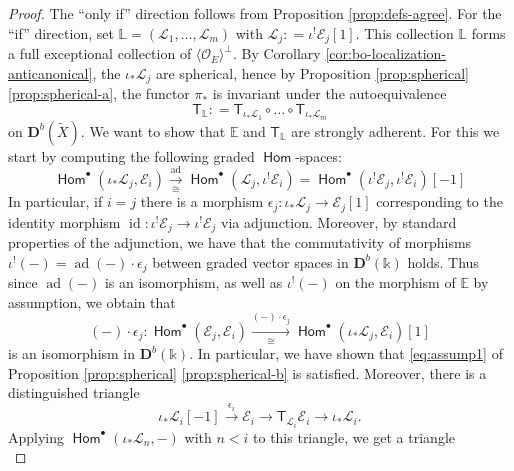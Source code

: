\documentclass[a4paper,11pt, reqno]{amsart}
\def\E{\mathbb E}
\def\L{\mathbb L}
\def\DD{\mathbf D}
\def\OO{\mathcal O}
\def\sE{\mathscr{E}}
\def\sL{\mathscr{L}}
\def\id{{\operatorname{id}}}
\def\ad{{\operatorname{ad}}}
\newcommand{\opname}[1]{\operatorname{\mathsf{#1}}}
\newcommand{\Hom}{\opname{Hom}}
\def\Db{\DD^b}
\newcommand{\bT}{\mathsf{T}}
\theoremstyle{plain}
\theoremstyle{definition}
\numberwithin{equation}{section}
\newlength{\arrow}
\begin{document}
\begin{proof}
    The ``only if'' direction follows from Proposition \ref{prop:defs-agree}.
    For the ``if'' direction,
    set $\L = ( \sL_1 , \ldots , \sL_{m} )$ with $\sL_j : = \iota^!  \sE_j  [1]$. 
    This collection $\L$ forms a full exceptional collection of $\langle \OO_E \rangle^\perp$. 
    By Corollary \ref{cor:bo-localization-anticanonical}, the $\iota_\ast\sL_j$ are spherical, hence
    by Proposition \ref{prop:spherical} \ref{prop:spherical-a}, the functor $\pi_\ast $ is invariant under the autoequivalence
    \[\bT_\L : = \bT_{\iota_\ast\sL_1} \circ \ldots \circ \bT_{\iota_\ast\sL_m}\] 
    on $\Db( \tilde{X}).$
    We want to show that $\E$ and $\bT_{\L}$
    are strongly adherent.
    For this we start by computing the following graded  $\Hom$-spaces:
    \begin{equation}
        \Hom^\bullet ( \iota_\ast \sL_j , \sE_i ) \xrightarrow[\cong]{\ad} \Hom^\bullet ( \sL_j , \iota^! \sE_i ) = \Hom^\bullet ( \iota^! \sE_j , \iota^! \sE_i ) [-1]
    \end{equation}
    In particular, if $i=j$ there is a morphism $\epsilon_j \colon \iota_\ast\sL_j \to \sE_j [1] $ corresponding to the identity morphism $\id \colon \iota^!\sE_j \to \iota^! \sE_j$ via adjunction.
    Moreover, by standard properties of the adjunction, we have that the commutativity of morphisms
    $\iota^! (-)  = \ad (-)\cdot \epsilon_j$ between graded vector spaces in $\Db(\mathbb{k})$ holds.
    Thus since $\ad (-)$ is an isomorphism, as well as $\iota^! (-)$ on the morphism of $\E$ by assumption, we obtain that
    \begin{equation}\label{eq:some-hom-prop}
        (-)\cdot \epsilon_j \colon \Hom^\bullet (\sE_j , \sE_i ) \xrightarrow[\cong]{(-)\cdot\epsilon_j} \Hom^\bullet (   \iota_\ast \sL_j, \sE_i )[1]
    \end{equation}
    is an isomorphism in $\Db(\mathbb{k})$.
    In particular, we have shown that \eqref{eq:assump1}  of Proposition \ref{prop:spherical} \ref{prop:spherical-b} is satisfied.
    Moreover, there is a distinguished triangle
    \begin{equation}\label{eq:spherical-iso-2}
          \iota_\ast \sL_i [-1] \xrightarrow{\epsilon_i} \sE_i \to \bT_{\sL_i } \sE_i \to \iota_\ast \sL_i    .
    \end{equation}
    Applying $\Hom^\bullet ( \iota_\ast \sL_n , - )$ with $n < i$ to this triangle, we get a triangle 
    \begin{equation}\label{eq:another-dist-triangle}

\end{equation}
\end{proof}
\end{document}
